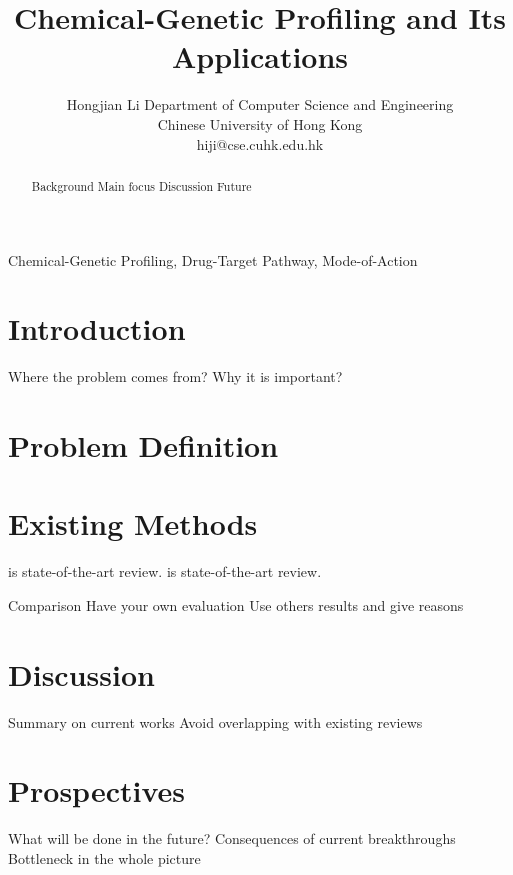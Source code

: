 \documentclass[12pt,conference,compsocconf]{../IEEEtran}
\begin{document}
\title{Chemical-Genetic Profiling and Its Applications}
\author
{
\IEEEauthorblockN
{
Hongjian Li
\IEEEauthorblockA
{
Department of Computer Science and Engineering\\
Chinese University of Hong Kong\\
hiji@cse.cuhk.edu.hk
}
}
}
\maketitle

\begin{abstract}

Background
Main focus
Discussion
Future

\end{abstract}

\begin{IEEEkeywords}

Chemical-Genetic Profiling, Drug-Target Pathway, Mode-of-Action

\end{IEEEkeywords}

\section{Introduction}

Where the problem comes from?
Why it is important?

\section{Problem Definition}



\section{Existing Methods}

\citep{1078}
\citep{1079}
\citep{1080}
\citep{1081} is state-of-the-art review.
\citep{1082} is state-of-the-art review.

Comparison
Have your own evaluation
Use others results and give reasons

\section{Discussion}

Summary on current works
  Avoid overlapping with existing reviews

\section{Prospectives}

What will be done in the future?
  Consequences of current breakthroughs
  Bottleneck in the whole picture



\end{document}
